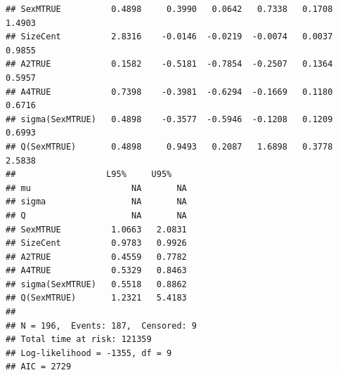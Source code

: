 \documentclass{article}\usepackage[]{graphicx}\usepackage[]{color}
\makeatletter
\newenvironment{kframe}{%
 \def\at@end@of@kframe{}%
 \ifinner\ifhmode%
  \def\at@end@of@kframe{\end{minipage}}%
  \begin{minipage}{\columnwidth}%
 \fi\fi%
 \def\FrameCommand##1{\hskip\@totalleftmargin \hskip-\fboxsep
 \colorbox{shadecolor}{##1}\hskip-\fboxsep
     \hskip-\linewidth \hskip-\@totalleftmargin \hskip\columnwidth}%
 \MakeFramed {\advance\hsize-\width
   \@totalleftmargin\z@ \linewidth\hsize
   \@setminipage}}%
 {\par\unskip\endMakeFramed%
 \at@end@of@kframe}
\newenvironment{knitrout}{}{} %
\makeatother
\begin{document}
\begin{knitrout}
\begin{kframe}
\begin{verbatim}
## SexMTRUE          0.4898     0.3990   0.0642   0.7338   0.1708   1.4903 
## SizeCent          2.8316    -0.0146  -0.0219  -0.0074   0.0037   0.9855 
## A2TRUE            0.1582    -0.5181  -0.7854  -0.2507   0.1364   0.5957 
## A4TRUE            0.7398    -0.3981  -0.6294  -0.1669   0.1180   0.6716 
## sigma(SexMTRUE)   0.4898    -0.3577  -0.5946  -0.1208   0.1209   0.6993 
## Q(SexMTRUE)       0.4898     0.9493   0.2087   1.6898   0.3778   2.5838 
##                  L95%     U95%   
## mu                    NA       NA
## sigma                 NA       NA
## Q                     NA       NA
## SexMTRUE          1.0663   2.0831
## SizeCent          0.9783   0.9926
## A2TRUE            0.4559   0.7782
## A4TRUE            0.5329   0.8463
## sigma(SexMTRUE)   0.5518   0.8862
## Q(SexMTRUE)       1.2321   5.4183
## 
## N = 196,  Events: 187,  Censored: 9
## Total time at risk: 121359
## Log-likelihood = -1355, df = 9
## AIC = 2729
\end{verbatim}
\end{kframe}
\end{knitrout}
\end{document}
